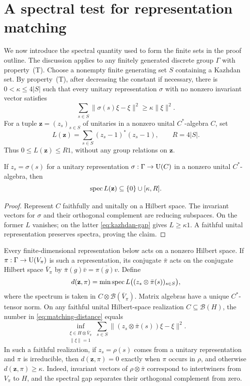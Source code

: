\section{A spectral test for representation matching}
\label{sec:spectral}

We now introduce the spectral quantity used to form the finite sets in
the proof outline. The discussion applies to any finitely generated
discrete group $\Gamma$ with property~(T).
Choose a nonempty finite generating set $S$ containing a Kazhdan set.
By property~(T), after decreasing the constant if necessary, there is
$0<\kappa\le4|S|$ such that every unitary representation $\sigma$ with
no nonzero invariant vector satisfies
\begin{equation}\label{eq:kazhdan-gap}
 \sum_{s\in S}\|\sigma(s)\xi-\xi\|^2\ge\kappa\|\xi\|^2.
\end{equation}
For a tuple $\mathbf z=(z_s)_{s\in S}$ of unitaries in a nonzero unital
$C^*$-algebra $C$, set
\begin{equation}\label{eq:laplacian}
 L(\mathbf z)=\sum_{s\in S}(z_s-1)^*(z_s-1),\qquad R=4|S|.
\end{equation}
Thus $0\le L(\mathbf z)\le R1$, without any group relations on
$\mathbf z$.

\begin{lemma}\label{lem:spectral-gap}
If $z_s=\sigma(s)$ for a unitary representation
$\sigma:\Gamma\to\operatorname{U}(C)$ in a nonzero unital $C^*$-algebra, then
\[
 \operatorname{spec} L(\mathbf z)\subseteq\{0\}\cup[\kappa,R].
\]
\end{lemma}
\begin{proof}
Represent $C$ faithfully and unitally on a Hilbert space. The invariant
vectors for $\sigma$ and their orthogonal complement are reducing
subspaces. On the former $L$ vanishes; on the latter
\eqref{eq:kazhdan-gap} gives $L\ge\kappa1$. A faithful unital
representation preserves spectra, proving the claim.
\end{proof}

Every finite-dimensional representation below acts on a nonzero Hilbert
space. If $\pi:\Gamma\to\operatorname{U}(V_\pi)$ is such a representation, its
conjugate $\bar\pi$ acts on the conjugate Hilbert space $\bar V_\pi$ by
$\bar\pi(g)\bar v=\overline{\pi(g)v}$. Define
\begin{equation}\label{eq:matching-distance}
 d(\mathbf z,\pi)=
 \min\operatorname{spec} L\bigl((z_s\otimes\bar\pi(s))_{s\in S}\bigr),
\end{equation}
where the spectrum is taken in
$C\otimes\mathcal B(\bar V_\pi)$. Matrix algebras have a unique
$C^*$-tensor norm. On any faithful unital Hilbert-space realization $C\subseteq
\mathcal B(H)$, the number in \eqref{eq:matching-distance} equals
\[
 \inf_{\substack{\xi\in H\otimes\bar V_\pi\\\|\xi\|=1}}
 \sum_{s\in S}\|(z_s\otimes\bar\pi(s))\xi-\xi\|^2.
\]
In such a faithful realization, if $z_s=\rho(s)$ comes from a unitary
representation and $\pi$ is irreducible, then $d(\mathbf z,\pi)=0$
exactly when $\pi$ occurs in $\rho$, and otherwise
$d(\mathbf z,\pi)\ge\kappa$. Indeed, invariant vectors of
$\rho\otimes\bar\pi$ correspond to intertwiners from $V_\pi$ to $H$,
and the spectral gap separates their orthogonal complement from zero.

